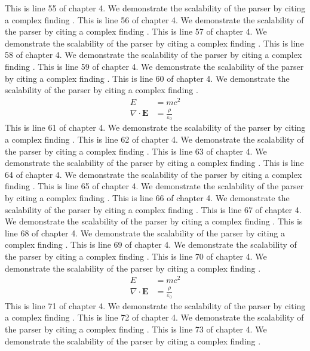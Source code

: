 This is line 55 of chapter 4. We demonstrate the scalability of the parser by citing a complex finding \cite{ref4_55}.
This is line 56 of chapter 4. We demonstrate the scalability of the parser by citing a complex finding \cite{ref4_56}.
This is line 57 of chapter 4. We demonstrate the scalability of the parser by citing a complex finding \cite{ref4_57}.
This is line 58 of chapter 4. We demonstrate the scalability of the parser by citing a complex finding \cite{ref4_58}.
This is line 59 of chapter 4. We demonstrate the scalability of the parser by citing a complex finding \cite{ref4_59}.
This is line 60 of chapter 4. We demonstrate the scalability of the parser by citing a complex finding \cite{ref4_60}.
\begin{align*}
  E &= mc^2 \\
  \nabla \cdot \mathbf{E} &= \frac{\rho}{\varepsilon_0}
\end{align*}
This is line 61 of chapter 4. We demonstrate the scalability of the parser by citing a complex finding \cite{ref4_61}.
This is line 62 of chapter 4. We demonstrate the scalability of the parser by citing a complex finding \cite{ref4_62}.
This is line 63 of chapter 4. We demonstrate the scalability of the parser by citing a complex finding \cite{ref4_63}.
This is line 64 of chapter 4. We demonstrate the scalability of the parser by citing a complex finding \cite{ref4_64}.
This is line 65 of chapter 4. We demonstrate the scalability of the parser by citing a complex finding \cite{ref4_65}.
This is line 66 of chapter 4. We demonstrate the scalability of the parser by citing a complex finding \cite{ref4_66}.
This is line 67 of chapter 4. We demonstrate the scalability of the parser by citing a complex finding \cite{ref4_67}.
This is line 68 of chapter 4. We demonstrate the scalability of the parser by citing a complex finding \cite{ref4_68}.
This is line 69 of chapter 4. We demonstrate the scalability of the parser by citing a complex finding \cite{ref4_69}.
This is line 70 of chapter 4. We demonstrate the scalability of the parser by citing a complex finding \cite{ref4_70}.
\begin{align*}
  E &= mc^2 \\
  \nabla \cdot \mathbf{E} &= \frac{\rho}{\varepsilon_0}
\end{align*}
This is line 71 of chapter 4. We demonstrate the scalability of the parser by citing a complex finding \cite{ref4_71}.
This is line 72 of chapter 4. We demonstrate the scalability of the parser by citing a complex finding \cite{ref4_72}.
This is line 73 of chapter 4. We demonstrate the scalability of the parser by citing a complex finding \cite{ref4_73}.
